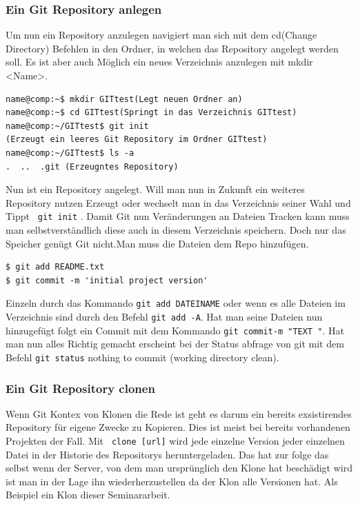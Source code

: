 \documentclass[12pt,a4paper,bibliography=totocnumbered,listof=totocnumbered]{scrartcl}
\begin{document}
\subsubsection{Ein Git Repository anlegen}
Um nun ein Repository anzulegen navigiert man sich mit dem cd(Change Directory) Befehlen in den Ordner, in welchen das Repository angelegt werden soll. Es ist aber auch Möglich ein neues Verzeichnis anzulegen mit mkdir <Name>. 

  \vspace{1em}
\begin{lstlisting}[caption=Git Repository anlegen, label=lst:arduino]
name@comp:~$ mkdir GITtest(Legt neuen Ordner an)
name@comp:~$ cd GITtest(Springt in das Verzeichnis GITtest)
name@comp:~/GITtest$ git init 
(Erzeugt ein leeres Git Repository im Ordner GITtest)
name@comp:~/GITtest$ ls -a
.  ..  .git (Erzeugntes Repository)

\end{lstlisting}

Nun ist ein Repository angelegt.
Will man nun in Zukunft ein weiteres Repository nutzen Erzeugt oder wechselt man in das Verzeichnis seiner Wahl und Tippt  \lstinline| git init| . Damit Git nun Veränderungen an Dateien Tracken kann muss man selbstverständlich diese auch in diesem Verzeichnis speichern. Doch nur das Speicher genügt Git nicht.Man muss die Dateien dem Repo hinzufügen. 

 \vspace{1em}
\begin{lstlisting}[caption=Git Repository Dateien hinzufügen, label=lst:arduino]
$ git add README.txt
$ git commit -m 'initial project version'

\end{lstlisting}


Einzeln durch das Kommando \lstinline|git add DATEINAME| oder wenn es alle Dateien im Verzeichnis sind durch den Befehl \lstinline|git add -A|. Hat man seine Dateien nun hinzugefügt folgt ein Commit mit dem Kommando \lstinline|git commit-m "TEXT "|. Hat man nun alles Richtig gemacht erscheint bei der Status abfrage von git mit dem Befehl \lstinline|git status| nothing to commit (working directory clean).


\subsubsection{Ein Git Repository clonen}
Wenn Git Kontex von Klonen die Rede ist geht es darum ein bereits exsistirendes Repository für eigene Zwecke zu Kopieren. Dies ist meist bei bereits vorhandenen Projekten der Fall. Mit \lstinline| clone [url]| wird jede einzelne Version jeder einzelnen Datei in der Historie des Repositorys heruntergeladen. Das hat zur folge das selbst wenn der Server, von dem man ursprünglich den Klone hat beschädigt wird ist man in der Lage ihn wiederherzustellen da der Klon alle Versionen hat. Als Beispiel ein Klon dieser Seminararbeit.
\end{document}
